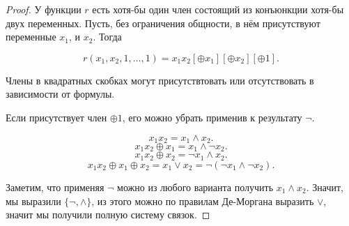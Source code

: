 \begin{theorem}
\begin{proof}
        У функции $r$ есть хотя-бы один член состоящий из конъюнкции хотя-бы двух переменных. Пусть, без ограничения общности, в нём присутствуют переменные $x_1$, и $x_2$. Тогда

        \[ r(x_1, x_2, 1, \ldots, 1) = x_1x_2[\oplus x_1][\oplus x_2][\oplus 1] .\]

        Члены в квадратных скобках могут присутствтовать или отсутствовать в зависимости от формулы.

        Если присутствует член $\oplus 1$, его можно убрать применив к результату $\neg$.

        \[ x_1x_2 = x_1 \land x_2 .\]
        \[ x_1x_2\oplus x_1 = x_1 \land \neg x_2 .\] 
        \[ x_1x_2\oplus x_2 = \neg x_1 \land x_2 .\] 
        \[ x_1x_2\oplus x_1\oplus x_2 = x_1 \lor x_2 = \neg \left( \neg x_1 \land \neg x_2 \right)  .\]

        Заметим, что применяя $\neg$ можно из любого варианта получить $x_1 \land x_2$. Значит, мы выразили $\{\neg, \land\}$, из этого можно по правилам Де-Моргана выразить $\lor$, значит мы получили полную систему связок. 
    \end{proof}
\end{theorem}
